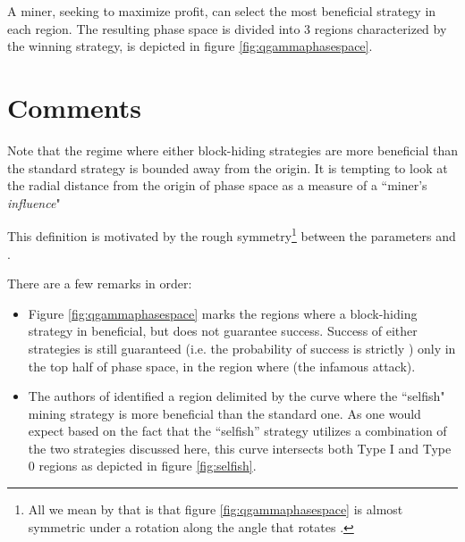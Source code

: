 \documentclass[letterpaper,12pt]{report}
\begin{document}
\noindent \begin{minipage}{\linewidth}
\label{fig:fourfunctions}
\end{minipage}
\linebreak

A miner, seeking to maximize profit, can select the most beneficial strategy in each region. The resulting phase space is divided into 3 regions characterized by the winning strategy, is depicted in figure \ref{fig:qgammaphasespace}.


\noindent \begin{minipage}{\linewidth}
\label{fig:qgammaphasespace}
\end{minipage}
\linebreak

\section{Comments}

Note that the regime where either block-hiding strategies are more beneficial than the standard strategy is bounded away from the origin. It is tempting to look at the radial distance from the origin of phase space as a measure of a ``miner's \textit{influence}" 




This definition is motivated by the rough symmetry\footnote{All we mean by that is that figure \ref{fig:qgammaphasespace} is almost symmetric under a rotation along the  angle that rotates .} between the parameters  and .

There are a few remarks in order:
\begin{itemize}
\item Figure \ref{fig:qgammaphasespace} marks the regions where a block-hiding strategy in beneficial, but does not guarantee success. Success of either strategies is still guaranteed (i.e. the probability of success is strictly ) only in the top half of phase space, in the region where  (the infamous  attack).
\item The authors of \cite{Selfish} identified a region delimited by the curve  where the ``selfish" mining strategy is more beneficial than the standard one. As one would expect based on the fact that the ``selfish'' strategy utilizes a combination of the two strategies discussed here, this curve intersects both Type I and Type 0 regions as depicted in figure \ref{fig:selfish}.
\end{itemize}
\end{document}
